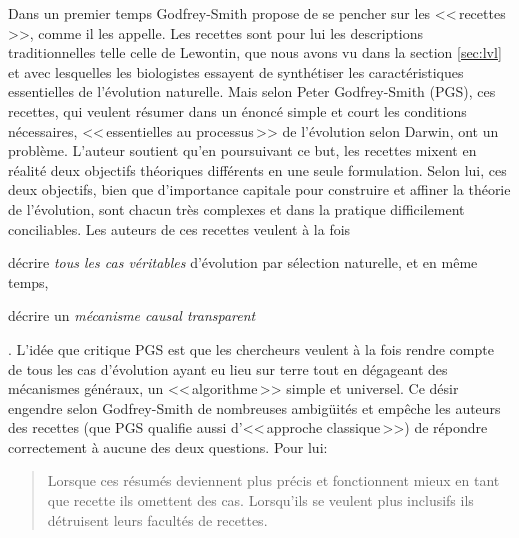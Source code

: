 Dans un premier temps Godfrey-Smith propose de se pencher sur les <<\,recettes\,>>, comme il les appelle. Les recettes sont pour lui les descriptions traditionnelles telle celle de Lewontin, que nous avons vu dans la section \ref{sec:lvl} et avec lesquelles les biologistes essayent de synthétiser les caractéristiques essentielles de l'évolution naturelle. Mais selon Peter Godfrey-Smith (PGS), ces recettes, qui veulent résumer dans un énoncé simple et court les conditions nécessaires, <<\,essentielles au processus\,>> de l'évolution selon Darwin, ont un problème. L'auteur soutient qu'en poursuivant ce but, les recettes mixent en réalité deux objectifs théoriques différents en une seule formulation. Selon lui, ces deux objectifs, bien que d'importance capitale pour construire et affiner la théorie de l'évolution, sont chacun très complexes et dans la pratique difficilement conciliables. Les auteurs de ces recettes veulent à la fois \begin{inparaenum}  \item décrire \emph{tous les cas véritables} d'évolution par sélection naturelle, et en même temps, \item décrire un \emph{mécanisme causal transparent}\end{inparaenum}. L'idée que critique PGS est que les chercheurs veulent à la fois rendre compte de tous les cas d'évolution ayant eu lieu sur terre tout en dégageant des mécanismes généraux, un <<\,algorithme\,>> simple et universel. Ce désir engendre selon Godfrey-Smith de nombreuses ambigüités et empêche les auteurs des recettes (que PGS qualifie aussi d'<<\,approche classique\,>>)  de répondre correctement à aucune des deux questions. Pour lui: \begin{quote}
		Lorsque ces résumés deviennent plus précis et fonctionnent mieux en tant que recette ils omettent des cas. Lorsqu'ils se veulent plus inclusifs ils détruisent leurs facultés de recettes.
		\citep[p.~27]{godfrey2009darwinian}
	\end{quote}

